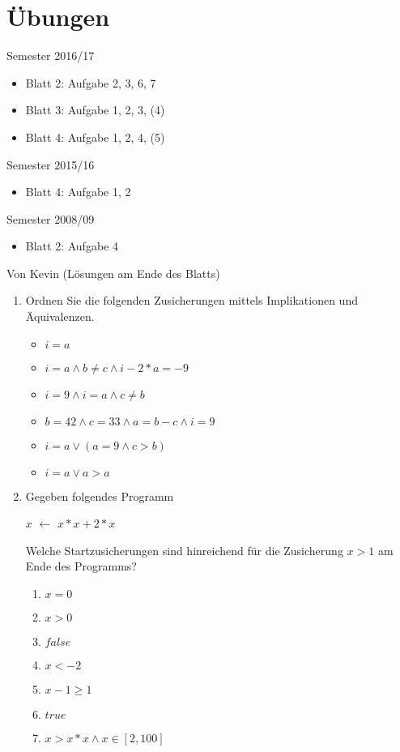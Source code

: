 \documentclass[hidelinks]{article}
\newcommand\Let[2]{\State #1 $\gets$ #2}
\theoremstyle{plain}
\theoremstyle{definition}
\theoremstyle{rem}
\begin{document}
\begin{sloppypar}
\section{Übungen}
Semester 2016/17
\begin{itemize}
\item Blatt 2: Aufgabe 2, 3, 6, 7
\item Blatt 3: Aufgabe 1, 2, 3, (4)
\item Blatt 4: Aufgabe 1, 2, 4, (5)
\end{itemize}
Semester 2015/16
\begin{itemize}
\item Blatt 4: Aufgabe 1, 2
\end{itemize}
Semester 2008/09
\begin{itemize}
\item Blatt 2: Aufgabe 4
\end{itemize}
Von Kevin (Lösungen am Ende des Blatts)
\begin{enumerate}
\item Ordnen Sie die folgenden Zusicherungen mittels Implikationen und Äquivalenzen.
\begin{itemize}
	\item $i=a$
	\item $i=a \wedge b\neq c\wedge i-2*a=-9$
	\item $i=9 \wedge i=a\wedge c\neq b$
	\item $b=42 \wedge c=33 \wedge a=b-c \wedge i=9$
	\item $i=a \vee (a=9 \wedge c>b)$
	\item $i=a \vee a>a$
\end{itemize}
\item Gegeben folgendes Programm
\begin{algorithm}[H]
    \begin{algorithmic}[1]
		\Let{$x$}{$x*x+2*x$}
	\EndWhile
  \end{algorithmic}
\end{algorithm}
Welche Startzusicherungen sind hinreichend für die Zusicherung $x>1$ am Ende des Programms?
\begin{enumerate}
	\item $x=0$
	\item $x>0$
	\item $false$
	\item $x<-2$
	\item $x-1\ge 1$
	\item $true$
	\item $x>x*x\wedge x\in[2,100]$

\end{enumerate}
\end{enumerate}
\end{sloppypar}
\end{document}
